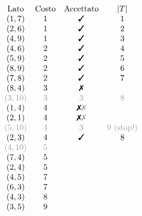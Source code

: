 \begin{equation*}
\begin{array}{ c c c c }
\text{Lato} & \text{Costo} & \text{Accettato} & | T| \\
( 1,7) & 1 & \text{\cmark}  & 1\\
( 2,6) & 1 & \text{\cmark}  & 2\\
( 4,9) & 1 & \text{\cmark}  & 3\\
( 4,6) & 2 & \text{\cmark}  & 4\\
( 5,9) & 2 & \text{\cmark}  & 5\\
( 8,9) & 2 & \text{\cmark}  & 6\\
( 7,8) & 2 & \text{\cmark}  & 7\\
( 8,4) & 3 & \text{\xmark}  & \\
\textcolor[rgb]{0.61,0.61,0.61}{( 3,10)} & \textcolor[rgb]{0.61,0.61,0.61}{3} & \textcolor[rgb]{0.61,0.61,0.61}{\cmark } & \textcolor[rgb]{0.61,0.61,0.61}{8}\\
( 1,4) & 4 & \text{\xmark \textcolor[rgb]{0.61,0.61,0.61}{\xmark }} & \\
( 2,1) & 4 & \text{\xmark \textcolor[rgb]{0.61,0.61,0.61}{\xmark }} & \\
\textcolor[rgb]{0.61,0.61,0.61}{( 5,10}\textcolor[rgb]{0.61,0.61,0.61}{)} & \textcolor[rgb]{0.61,0.61,0.61}{4} & \textcolor[rgb]{0.61,0.61,0.61}{\cmark } & \textcolor[rgb]{0.61,0.61,0.61}{9\ \text{(stop!)}}\\
( 2,3) & 4 & \text{\cmark}  & 8\\
\textcolor[rgb]{0.61,0.61,0.61}{( 4,10}\textcolor[rgb]{0.61,0.61,0.61}{)} & \textcolor[rgb]{0.61,0.61,0.61}{5} &  & \\
( 7,4) & 5 &  & \\
( 2,4) & 5 &  & \\
( 4,5) & 7 &  & \\
( 6,3) & 7 &  & \\
( 4,3) & 8 &  & \\
( 3,5) & 9 &  & 
\end{array}
\end{equation*}